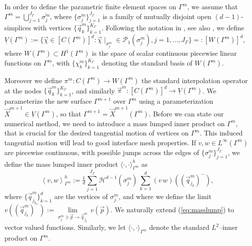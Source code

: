 \documentclass[a4paper,11pt,onecolumn]{article}
\newcommand{\Vh}{\underline{V}(\Gamma^m)}
\newcommand{\Wh}{W(\Gamma^m)}
\begin{document}
In order to define the parametric finite element spaces on $\Gamma^m$, we
assume that $\Gamma^m=\bigcup_{j=1}^{J_\Gamma} \overline{\sigma^m_j}$, where
$\{\sigma^m_j\}_{j=1}^{J_\Gamma}$ is a family of mutually disjoint open
$(d-1)$-simplices with vertices $\{\vec{q}^m_k\}_{k=1}^{K_\Gamma}$. Following
the notation in \cite{spurious}, see also \cite{gflows3d}, we define
$\Vh := \{\vec\chi \in [C(\Gamma^m)]^d:\vec\chi\!\mid_{\sigma^m_j}
\in \mathcal{P}_1(\sigma^m_j), j=1,\ldots, J_\Gamma\} =: [\Wh]^d$,
where $\Wh \subset H^1(\Gamma^m)$ is the space of scalar continuous
piecewise linear functions on $\Gamma^m$, with $\{\chi^m_k\}_{k=1}^{K_\Gamma}$
denoting the standard basis of $\Wh$.

Moreover we define $\pi^m: C(\Gamma^m)\to \Wh$ the standard interpolation
operator at the nodes $\{\vec{q}_k^m\}_{k=1}^{K_\Gamma}$, and similarly
$\vec\pi^m: [C(\Gamma^m)]^d\to \Vh$. We parameterize the new surface
$\Gamma^{m+1}$ over $\Gamma^m$ using a parameterization
$\vec{X}^{m+1} \in \Vh$, so that $\Gamma^{m+1} = \vec{X}^{m+1}(\Gamma^m)$.
Before we can state our numerical method, we need to introduce a mass lumped
inner product on $\Gamma^m$, that is crucial for the desired tangential motion
of vertices on $\Gamma^m$. This induced tangential motion
will lead to good interface mesh properties.
If $v,w \in L^\infty(\Gamma^m)$ are piecewise continuous, with possible jumps
across the edges of $\{\sigma_j^m\}_{j=1}^{J_\Gamma}$, we define the mass
lumped inner product $\langle\cdot,\cdot\rangle_{\Gamma^m}^h$ as
\begin{equation} \label{eq:masslump}
\left\langle v, w \right\rangle^h_{\Gamma^m} :=
\tfrac1d \sum_{j=1}^{J_\Gamma} \mathcal{H}^{d-1}(\sigma^m_j)\,
\sum_{k=1}^{d} (v\,w)((\vec{q}^m_{j_k})^-),
\end{equation}
where $\{\vec{q}^m_{j_k}\}_{k=1}^{d}$ are the vertices of $\sigma^m_j$, and
where we define the limit $v((\vec{q}^m_{j_k})^-)
:= \underset{\sigma^m_j\ni \vec{p}\to \vec{q}^m_{j_k}}{\lim}\, v(\vec{p})$. We
naturally extend (\ref{eq:masslump}) to vector valued functions. Similarly, we
let $\langle\cdot,\cdot\rangle_{\Gamma^m}$ denote the standard $L^2$--inner
product on $\Gamma^m$.
\end{document}
